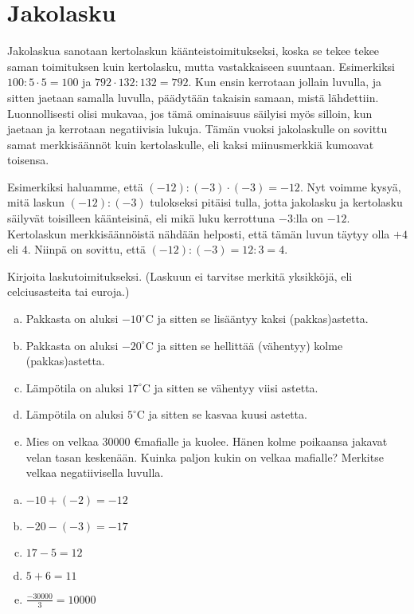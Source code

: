 \section{Jakolasku}

    Jakolaskua sanotaan kertolaskun käänteistoimitukseksi, koska se tekee tekee
    saman toimituksen kuin kertolasku, mutta vastakkaiseen suuntaan. Esimerkiksi
    $100:5\cdot 5=100$ ja $792\cdot 132:132=792$. Kun ensin kerrotaan jollain
    luvulla, ja sitten jaetaan samalla luvulla, päädytään takaisin samaan, mistä 
    lähdettiin. Luonnollisesti olisi mukavaa, jos tämä ominaisuus säilyisi myös
    silloin, kun jaetaan ja kerrotaan negatiivisia lukuja. Tämän vuoksi jakolaskulle
    on sovittu samat merkkisäännöt kuin kertolaskulle, eli kaksi miinusmerkkiä
    kumoavat toisensa.
    
    Esimerkiksi haluamme, että $(-12):(-3)\cdot (-3)=-12$. Nyt voimme kysyä, mitä
    laskun $(-12):(-3)$ tulokseksi pitäisi tulla, jotta jakolasku ja kertolasku
    säilyvät toisilleen käänteisinä, eli mikä luku kerrottuna $-3$:lla on $-12$.
    Kertolaskun merkkisäännöistä nähdään helposti, että tämän luvun täytyy olla
    $+4$ eli $4$. Niinpä on sovittu, että $(-12):(-3)=12:3=4$.
    
    \begin{tehtava}
        Kirjoita laskutoimitukseksi. (Laskuun ei tarvitse merkitä yksikköjä, eli celciusasteita tai euroja.)
        \begin{enumerate}[a)]
            \item Pakkasta on aluksi $-10^{\circ}$C ja sitten se lisääntyy kaksi (pakkas)astetta.
            \item Pakkasta on aluksi $-20^{\circ}$C ja sitten se hellittää (vähentyy) kolme (pakkas)astetta.
            \item Lämpötila on aluksi $17^{\circ}$C ja sitten se vähentyy viisi astetta.
            \item Lämpötila on aluksi $5^{\circ}$C ja sitten se kasvaa kuusi astetta.
            \item Mies on velkaa $30 000$ \euro mafialle ja kuolee. Hänen kolme
                poikaansa jakavat velan tasan keskenään. Kuinka paljon kukin on
                velkaa mafialle? Merkitse velkaa negatiivisella luvulla.
        \end{enumerate}
        
        \begin{vastaus}
            \begin{enumerate}[a)]
                \item $-10+(-2)=-12$
                \item $-20-(-3)=-17$
                \item $17-5=12$
                \item $5+6=11$
                \item $\frac{-30 000}{3}=10 000$
            \end{enumerate}
        \end{vastaus}
    \end{tehtava}
    
